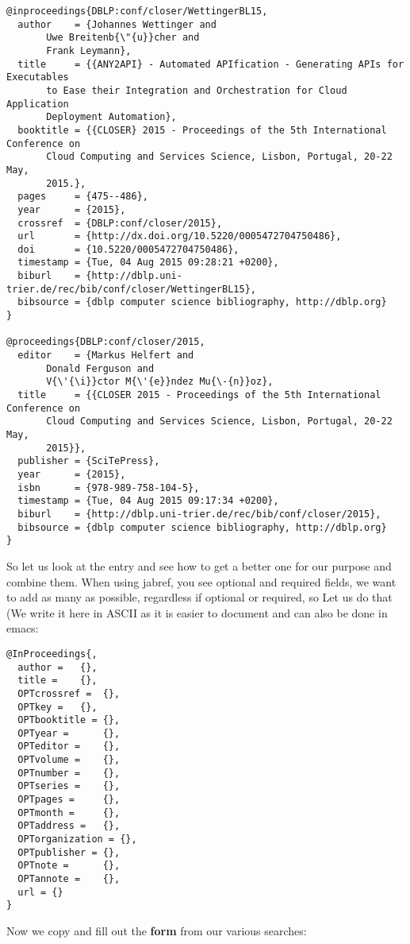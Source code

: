 \begin{verbatim}
@inproceedings{DBLP:conf/closer/WettingerBL15,
  author    = {Johannes Wettinger and
       Uwe Breitenb{\"{u}}cher and
       Frank Leymann},
  title     = {{ANY2API} - Automated APIfication - Generating APIs for Executables
       to Ease their Integration and Orchestration for Cloud Application
       Deployment Automation},
  booktitle = {{CLOSER} 2015 - Proceedings of the 5th International Conference on
       Cloud Computing and Services Science, Lisbon, Portugal, 20-22 May,
       2015.},
  pages     = {475--486},
  year      = {2015},
  crossref  = {DBLP:conf/closer/2015},
  url       = {http://dx.doi.org/10.5220/0005472704750486},
  doi       = {10.5220/0005472704750486},
  timestamp = {Tue, 04 Aug 2015 09:28:21 +0200},
  biburl    = {http://dblp.uni-trier.de/rec/bib/conf/closer/WettingerBL15},
  bibsource = {dblp computer science bibliography, http://dblp.org}
}

@proceedings{DBLP:conf/closer/2015,
  editor    = {Markus Helfert and
       Donald Ferguson and
       V{\'{\i}}ctor M{\'{e}}ndez Mu{\-{n}}oz},
  title     = {{CLOSER 2015 - Proceedings of the 5th International Conference on
       Cloud Computing and Services Science, Lisbon, Portugal, 20-22 May,
       2015}},
  publisher = {SciTePress},
  year      = {2015},
  isbn      = {978-989-758-104-5},
  timestamp = {Tue, 04 Aug 2015 09:17:34 +0200},
  biburl    = {http://dblp.uni-trier.de/rec/bib/conf/closer/2015},
  bibsource = {dblp computer science bibliography, http://dblp.org}
}
\end{verbatim}

So let us look at the entry and see how to get a better one for our
purpose and combine them. When using jabref, you see optional and
required fields, we want to add as many as possible, regardless if
optional or required, so Let us do that (We write it here in ASCII as it
is easier to document and can also be done in emacs:

\begin{verbatim}
@InProceedings{,
  author =   {},
  title =    {},
  OPTcrossref =  {},
  OPTkey =   {},
  OPTbooktitle = {},
  OPTyear =      {},
  OPTeditor =    {},
  OPTvolume =    {},
  OPTnumber =    {},
  OPTseries =    {},
  OPTpages =     {},
  OPTmonth =     {},
  OPTaddress =   {},
  OPTorganization = {},
  OPTpublisher = {},
  OPTnote =      {},
  OPTannote =    {},
  url = {}
}
\end{verbatim}

Now we copy and fill out the \textbf{form} from our various searches:

